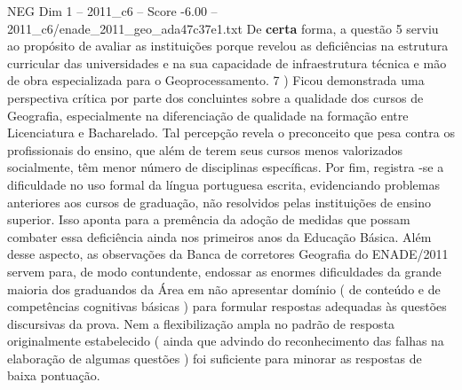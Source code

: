 \begin{textsample}{NEG Dim 1 – 2011\_c6 – Score -6.00 – 2011\_c6/enade\_2011\_geo\_ada47c37e1.txt}
De \textbf{certa} forma, a questão 5 serviu ao propósito de avaliar as instituições porque revelou as deficiências na estrutura curricular das universidades e na sua capacidade de infraestrutura técnica e mão de obra especializada para o Geoprocessamento. 7 ) Ficou demonstrada uma perspectiva crítica por parte dos concluintes sobre a qualidade dos cursos de Geografia, especialmente na diferenciação de qualidade na formação entre Licenciatura e Bacharelado.
Tal percepção revela o preconceito que pesa contra os profissionais do ensino, que além de terem seus cursos menos valorizados socialmente, têm menor número de disciplinas específicas.
Por fim, registra -se a dificuldade no uso formal da língua portuguesa escrita, evidenciando problemas anteriores aos cursos de graduação, não resolvidos pelas instituições de ensino superior.
Isso aponta para a premência da adoção de medidas que possam combater essa deficiência ainda nos primeiros anos da Educação Básica.
Além desse aspecto, as observações da Banca de corretores Geografia do ENADE/2011 servem para, de modo contundente, endossar as enormes dificuldades da grande maioria dos graduandos da Área em não apresentar domínio ( de conteúdo e de competências cognitivas básicas ) para formular respostas adequadas às questões discursivas da prova.
Nem a flexibilização ampla no padrão de resposta originalmente estabelecido ( ainda que advindo do reconhecimento das falhas na elaboração de algumas questões ) foi suficiente para minorar as respostas de baixa pontuação.

\end{textsample}
